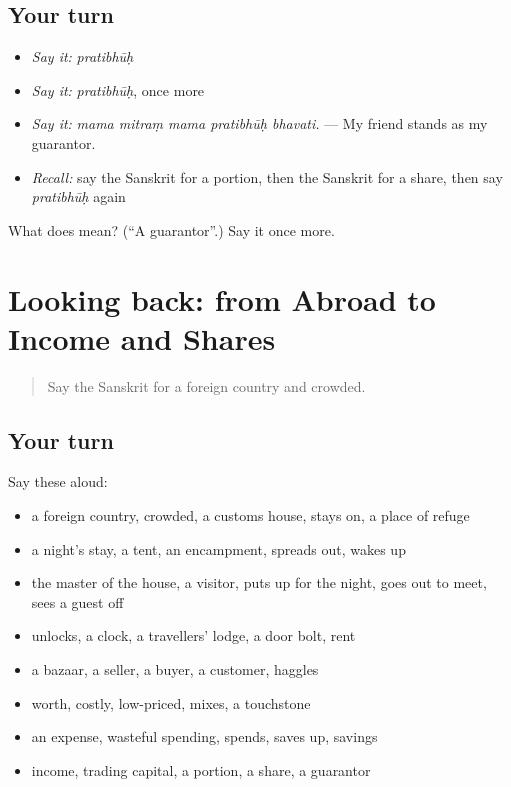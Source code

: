 \subsection*{Your turn}
\begin{itemize}
\raggedright
  \item \emph{Say it:} \emph{pratibhūḥ}
  \item \emph{Say it:} \emph{pratibhūḥ}, once more
  \item \emph{Say it:} \emph{mama mitraṃ mama pratibhūḥ bhavati.} — My friend stands as my guarantor.
  \item \emph{Recall:} say the Sanskrit for a portion, then the Sanskrit for a share, then say \emph{pratibhūḥ} again
\end{itemize}

\begin{tcolorbox}[breakable,colback=teal!4,colframe=teal!35!black,title={Before you move on}]
What does  mean? (\textquotedblleft{}A guarantor\textquotedblright{}.) Say it once more.
\end{tcolorbox}
\section[(dialogue)]{Looking back: from Abroad to Income and Shares}

\label{lesson:SA-R433-review-426-433}



\begin{quote}
Say the Sanskrit for a foreign country and crowded.
\end{quote}

\subsection*{Your turn}
Say these aloud:

\begin{itemize}
\raggedright
  \item a foreign country, crowded, a customs house, stays on, a place of refuge
  \item a night's stay, a tent, an encampment, spreads out, wakes up
  \item the master of the house, a visitor, puts up for the night, goes out to meet, sees a guest off
  \item unlocks, a clock, a travellers' lodge, a door bolt, rent
  \item a bazaar, a seller, a buyer, a customer, haggles
  \item worth, costly, low-priced, mixes, a touchstone
  \item an expense, wasteful spending, spends, saves up, savings
  \item income, trading capital, a portion, a share, a guarantor
\end{itemize}

